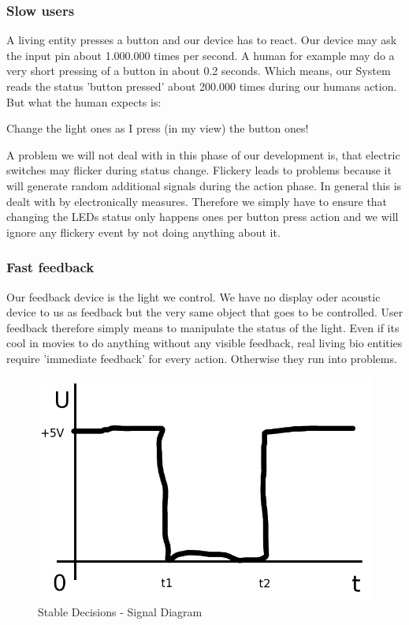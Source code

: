 \subsubsection{Slow users}

A living entity presses a button and our device has to react. Our device may ask the input pin about 1.000.000 times per second. A human for example may do a very short pressing of a button in about 0.2 seconds. Which means, our System reads the status 'button pressed' about 200.000 times during our humans action. But what the human expects is:

\begin{center}
Change the light ones as I press (in my view) the button ones!
\end{center}

A problem we will not deal with in this phase of our development is, that electric switches may flicker during status change. Flickery leads to problems because it will generate random additional signals during the action phase. In general this is dealt with by electronically measures. Therefore we simply have to ensure that changing the LEDs status only happens ones per button press action and we will ignore any flickery event by not doing anything about it.

\subsubsection{Fast feedback}

Our feedback device is the light we control. We have no display oder acoustic device to us as feedback but the very same object that goes to be controlled. User feedback therefore simply means to manipulate the status of the light. Even if its cool in movies to do anything without any visible feedback, real living bio entities require 'immediate feedback' for every action. Otherwise they run into problems.


\begin{figure}[htbp]
  \centering
  \includegraphics[width=120mm]{LED/S005_stable-decisions_ideal_signal.png}
  \caption{Stable Decisions - Signal Diagram}
  \label{S005SignalDiagam}
\end{figure}

